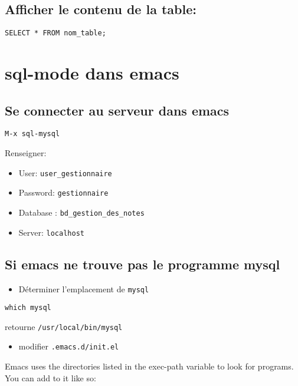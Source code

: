\documentclass[11pt]{article}
\begin{document}
\subsection{Afficher le contenu de la table:}
\label{sec:org636b602}
\begin{verbatim}
SELECT * FROM nom_table;
\end{verbatim}






\section{sql-mode dans emacs}
\label{sec:org6340d34}

\subsection{Se connecter au serveur dans emacs}
\label{sec:org5ffab25}

\texttt{M-x sql-mysql}

Renseigner:
\begin{itemize}
\item User: \texttt{user\_gestionnaire}
\item Password: \texttt{gestionnaire}
\item Database : \texttt{bd\_gestion\_des\_notes}
\item Server: \texttt{localhost}
\end{itemize}

\subsection{Si emacs ne trouve pas le programme mysql}
\label{sec:orga02b682}
\begin{itemize}
\item Déterminer l'emplacement de \texttt{mysql}
\end{itemize}
\begin{verbatim}
which mysql
\end{verbatim}
retourne \texttt{/usr/local/bin/mysql}

\begin{itemize}
\item modifier \texttt{.emacs.d/init.el}
\end{itemize}
Emacs uses the directories listed in the exec-path variable to look for programs. You can add to it like so:
\end{document}
